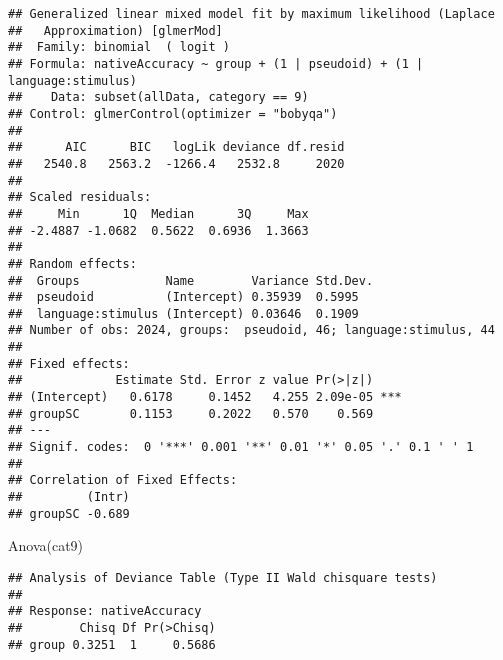 \documentclass[
]{article}
\newenvironment{Shaded}{\begin{snugshade}}{\end{snugshade}}
\newcommand{\AttributeTok}[1]{\textcolor[rgb]{0.77,0.63,0.00}{#1}}
\newcommand{\DecValTok}[1]{\textcolor[rgb]{0.00,0.00,0.81}{#1}}
\newcommand{\FunctionTok}[1]{\textcolor[rgb]{0.00,0.00,0.00}{#1}}
\newcommand{\NormalTok}[1]{#1}
\newcommand{\OtherTok}[1]{\textcolor[rgb]{0.56,0.35,0.01}{#1}}
\newcommand{\SpecialCharTok}[1]{\textcolor[rgb]{0.00,0.00,0.00}{#1}}
\newcommand{\StringTok}[1]{\textcolor[rgb]{0.31,0.60,0.02}{#1}}
\begin{document}
\begin{verbatim}
## Generalized linear mixed model fit by maximum likelihood (Laplace
##   Approximation) [glmerMod]
##  Family: binomial  ( logit )
## Formula: nativeAccuracy ~ group + (1 | pseudoid) + (1 | language:stimulus)
##    Data: subset(allData, category == 9)
## Control: glmerControl(optimizer = "bobyqa")
## 
##      AIC      BIC   logLik deviance df.resid 
##   2540.8   2563.2  -1266.4   2532.8     2020 
## 
## Scaled residuals: 
##     Min      1Q  Median      3Q     Max 
## -2.4887 -1.0682  0.5622  0.6936  1.3663 
## 
## Random effects:
##  Groups            Name        Variance Std.Dev.
##  pseudoid          (Intercept) 0.35939  0.5995  
##  language:stimulus (Intercept) 0.03646  0.1909  
## Number of obs: 2024, groups:  pseudoid, 46; language:stimulus, 44
## 
## Fixed effects:
##             Estimate Std. Error z value Pr(>|z|)    
## (Intercept)   0.6178     0.1452   4.255 2.09e-05 ***
## groupSC       0.1153     0.2022   0.570    0.569    
## ---
## Signif. codes:  0 '***' 0.001 '**' 0.01 '*' 0.05 '.' 0.1 ' ' 1
## 
## Correlation of Fixed Effects:
##         (Intr)
## groupSC -0.689
\end{verbatim}

\begin{Shaded}
\begin{Highlighting}[]
\FunctionTok{Anova}\NormalTok{(cat9)}
\end{Highlighting}
\end{Shaded}

\begin{verbatim}
## Analysis of Deviance Table (Type II Wald chisquare tests)
## 
## Response: nativeAccuracy
##        Chisq Df Pr(>Chisq)
## group 0.3251  1     0.5686
\end{verbatim}

\begin{Shaded}
\end{Shaded}
\end{document}
